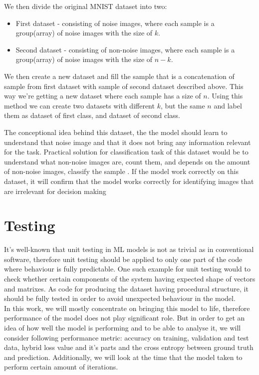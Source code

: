 We then divide the original MNIST dataset into two:
\begin{itemize}
	\item First dataset - consisting of noise images, where each sample is a group(array)
		of noise images with the size of $k$.
	\item Second dataset - consisting of non-noise images, where each sample is a group(array)
		of noise images with the size of $n-k$.
\end{itemize}

We then create a new dataset and fill the sample that is a concatenation of sample
from first dataset with sample of second dataset described above.
This way we're getting a new dataset
where each sample has a size of $n$. Using this method we can create two datasets with
different $k$, but the same $n$ and label them as dataset of first class, and
dataset of second class.

The conceptional idea behind this dataset, the the model should learn to
understand that noise image and that it does not bring any information relevant for the task.
Practical solution for classification task of this dataset would be
to understand what non-noise images are,
count them, and depends on the amount of non-noise images,
classify the sample
. If the model work correctly on this dataset, it will confirm
 that the model works correctly
for identifying images that are irrelevant for decision making

\section{Testing}
It's well-known that unit testing in ML models is not as trivial
as in conventional software,
therefore unit testing should be applied to only one part of the code where
behaviour is fully predictable. One such example for unit testing would to
check whether
certain components of the system having expected shape of vectors and matrixes.
As code for producing the dataset having procedural structure,
it should be fully tested in order to avoid
unexpected behaviour in the model.
\\
In this work, we will mostly concentrate on bringing this model to life,
therefore performance of the model does not play significant role.
But in order to get an idea of how well the model is performing and
to be able to analyse it, we will consider following performance metric:
accuracy on training, validation and test data, hybrid loss value and it's parts
and the cross entropy between ground truth and prediction. Additionally,
we will look at the time that the model taken to perform certain
amount of iterations.

